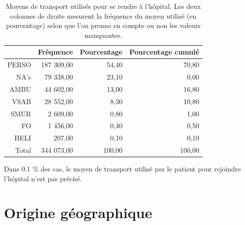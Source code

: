 \documentclass[12pt,english,french,twoside]{book}\usepackage[]{graphicx}\usepackage[]{color}
\begin{document}
\begin{table}[ht]
\centering
\begin{tabular}{rrrr}
  \hline
 & Fréquence & Pourcentage & Pourcentage cumulé \\ 
  \hline
PERSO & 187 309,00 & 54,40 & 70,80 \\ 
  NA's & 79 338,00 & 23,10 & 0,00 \\ 
  AMBU & 44 602,00 & 13,00 & 16,80 \\ 
  VSAB & 28 552,00 & 8,30 & 10,80 \\ 
  SMUR & 2 609,00 & 0,80 & 1,00 \\ 
  FO & 1 456,00 & 0,40 & 0,50 \\ 
  HELI & 207,00 & 0,10 & 0,10 \\ 
    Total & 344 073,00 & 100,00 & 100,00 \\ 
   \hline
\end{tabular}
\caption[Moyens de transport]{Moyens de transport utilisés pour se rendre à l'hôpital. Les deux colonnes de droite mesurent la fréquence du moyen utilisé (en pourcentage) selon que l'on prenne en compte ou non les valeurs manquantes. } 
\label{transport}
\end{table}


Dans 0.1 \% des cas, le moyen de transport utilisé par le patient pour rejoindre l'hôpital n'est pas précisé.

\section*{Origine géographique}

\end{document}
